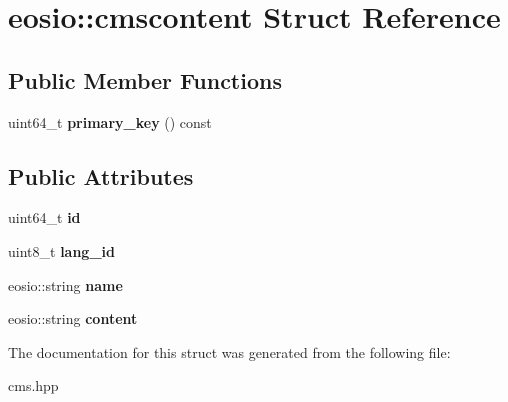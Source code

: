 \hypertarget{structeosio_1_1cmscontent}{}\section{eosio\+:\+:cmscontent Struct Reference}
\label{structeosio_1_1cmscontent}
\subsection*{Public Member Functions}
\begin{DoxyCompactItemize}
\item 
\mbox{\label{structeosio_1_1cmscontent_a9e9428636f08f8b440c013c7b5dcab4a}} 
uint64\+\_\+t {\bfseries primary\+\_\+key} () const
\end{DoxyCompactItemize}
\subsection*{Public Attributes}
\begin{DoxyCompactItemize}
\item 
\mbox{\label{structeosio_1_1cmscontent_acbc75ee995e0202671d6d6233446e971}} 
uint64\+\_\+t {\bfseries id}
\item 
\mbox{\label{structeosio_1_1cmscontent_ad89ffbcf1094086c6bc5550bf5eaa66e}} 
uint8\+\_\+t {\bfseries lang\+\_\+id}
\item 
\mbox{\label{structeosio_1_1cmscontent_a3e460045d2571dc64686f5140182fc67}} 
eosio\+::string {\bfseries name}
\item 
\mbox{\label{structeosio_1_1cmscontent_aa6935986b4beb8dc31772fb6feb9ec3a}} 
eosio\+::string {\bfseries content}
\end{DoxyCompactItemize}


The documentation for this struct was generated from the following file\+:\begin{DoxyCompactItemize}
\item 
cms.\+hpp\end{DoxyCompactItemize}
